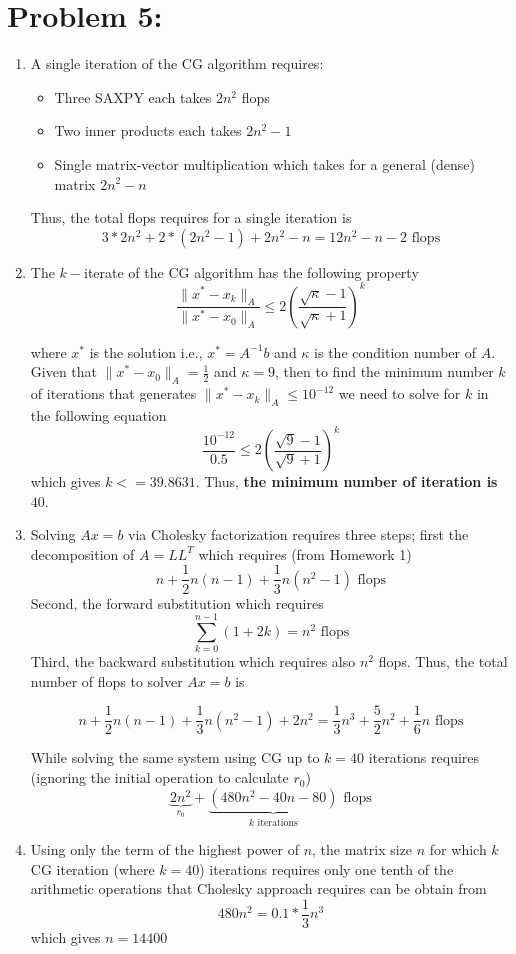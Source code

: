 \newpage
\section*{Problem 5:}
\begin{enumerate}
\item A single iteration of the CG algorithm requires:
\begin{itemize}
\item Three SAXPY each takes $2n^{2}$ flops
\item Two inner products each takes $2n^{2} -1$
\item Single matrix-vector multiplication which takes for a general (dense) matrix $2n^2-n$
\end{itemize}
Thus, the total flops requires for a single iteration is 
$$
3*2n^{2} + 2*(2n^{2} -1) + 2n^2-n = 12 n^{2} - n - 2 \text{\ flops}
$$

\item The $k-$iterate of the CG algorithm has the following property
$$
\frac{\parallel x^{*} - x_{k} \parallel_{A}}{\parallel x^{*} - x_{0} \parallel_{A}} \leq 2 \left( \frac{\sqrt{\kappa}-1}{\sqrt{\kappa}+1}\right) ^{k}
$$

where $x^{*}$ is the solution i.e.,  $x^{*} = A^{-1}b$ and $\kappa$ is the condition number of $A$. Given that $\parallel x^{*} - x_{0} \parallel_{A} = \frac{1}{2}$ and $\kappa = 9$, then to find the minimum number $k$ of iterations that generates $\parallel x^{*} - x_{k} \parallel_{A} \leq 10^{-12}$ we need to solve for $k$ in the following equation 
$$
\frac{10^{-12}}{0.5} \leq 2 \left( \frac{\sqrt{9}-1}{\sqrt{9}+1}\right) ^{k}
$$
which gives $k<= 39.8631$. Thus, \textbf{the minimum number of iteration is $40$}.

\item Solving $Ax = b$ via Cholesky factorization requires three steps; first the decomposition of $A = LL^{T}$ which requires (from Homework 1)
$$
n + \frac{1}{2}n(n-1) + \frac{1}{3}n(n^2-1) \text{\ flops}
$$
Second, the forward substitution which requires 
$$
\sum_{k=0}^{n-1}(1+2k) = n^{2} \text{\ flops}
$$
Third, the backward substitution which requires also $n^{2}$ flops. Thus, the total number of flops to solver $Ax = b$ is 

$$
n + \frac{1}{2}n(n-1) + \frac{1}{3}n(n^2-1) + 2n^{2} = \frac{1}{3}n^{3} + \frac{5}{2}n^{2} + \frac{1}{6}n \text{\ flops}
$$

While solving the same system using CG up to $k=40$ iterations requires (ignoring the initial operation to calculate $r_{0}$) 
$$
 \underbrace{2n^2}_\textrm{$r_{0}$} + \underbrace{(480 n^{2} - 40n - 80)}_\textrm{$k$ iterations} \text{\ flops}
$$
\item Using only the term of the highest power of $n$, the matrix size $n$ for which $k$ CG iteration (where $k=40$) iterations requires only one tenth of the arithmetic operations that Cholesky approach requires can be obtain from 
$$
480n^{2} = 0.1*\frac{1}{3}n^{3}
$$
which gives $n=14400$
\end{enumerate} 